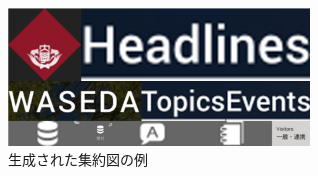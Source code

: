 \begin{figure}[H]
    \centering
    \includegraphics[width=8cm]{figures/example-importanceregion.png}
    \caption{生成された集約図の例}
    \label{fig_imoortanceregion}
\end{figure}
